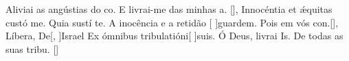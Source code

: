 {    {Aliviai as angústias do co.  E livrai-me das minhas a. [\LinkPT]},
  {Innocéntia et ǽquitas custó me.  Quia sustí te. }%
    {A inocência e a retidão [ ]{guar}dem.  Pois em vós con.[\LinkPT]},
  {Líbera, De[, ]{Is}rael  Ex ómnibus tribulatióni[ ]{su}is. }%
    {Ó Deus, livrai Is.  De todas as suas tribu. [\LinkPT]}
}